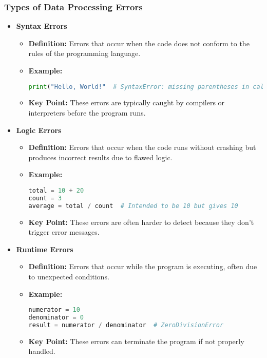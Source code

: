 \documentclass[aspectratio=169]{beamer}
\begin{document}
\begin{frame}[fragile]
    \frametitle{Types of Data Processing Errors}
    \begin{itemize}
        \item \textbf{Syntax Errors}
        \begin{itemize}
            \item \textbf{Definition:} Errors that occur when the code does not conform to the rules of the programming language.
            \item \textbf{Example:}
            \begin{lstlisting}[language=Python]
print("Hello, World!"  # SyntaxError: missing parentheses in call to 'print'
            \end{lstlisting}
            \item \textbf{Key Point:} These errors are typically caught by compilers or interpreters before the program runs.
        \end{itemize}

        \item \textbf{Logic Errors}
        \begin{itemize}
            \item \textbf{Definition:} Errors that occur when the code runs without crashing but produces incorrect results due to flawed logic.
            \item \textbf{Example:}
            \begin{lstlisting}[language=Python]
total = 10 + 20
count = 3
average = total / count  # Intended to be 10 but gives 10
            \end{lstlisting}
            \item \textbf{Key Point:} These errors are often harder to detect because they don’t trigger error messages.
        \end{itemize}

        \item \textbf{Runtime Errors}
        \begin{itemize}
            \item \textbf{Definition:} Errors that occur while the program is executing, often due to unexpected conditions.
            \item \textbf{Example:}
            \begin{lstlisting}[language=Python]
numerator = 10
denominator = 0
result = numerator / denominator  # ZeroDivisionError
            \end{lstlisting}
            \item \textbf{Key Point:} These errors can terminate the program if not properly handled.
        \end{itemize}
    \end{itemize}
\end{frame}
\end{document}
